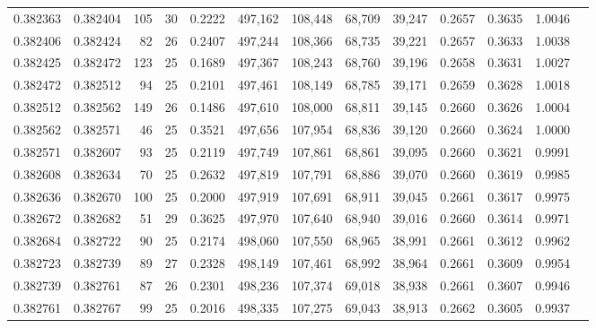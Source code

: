 \begin{tabular}{rrrrrrrrrrrrr}
0.382363 & 0.382404 &   105 &  30 &                                     0.2222 & 497,162 & 108,448 &  68,709 &  39,247 & 0.2657 & 0.3635 & 1.0046 \\
0.382406 & 0.382424 &    82 &  26 &                                     0.2407 & 497,244 & 108,366 &  68,735 &  39,221 & 0.2657 & 0.3633 & 1.0038 \\
0.382425 & 0.382472 &   123 &  25 &                                     0.1689 & 497,367 & 108,243 &  68,760 &  39,196 & 0.2658 & 0.3631 & 1.0027 \\
0.382472 & 0.382512 &    94 &  25 &                                     0.2101 & 497,461 & 108,149 &  68,785 &  39,171 & 0.2659 & 0.3628 & 1.0018 \\
0.382512 & 0.382562 &   149 &  26 &                                     0.1486 & 497,610 & 108,000 &  68,811 &  39,145 & 0.2660 & 0.3626 & 1.0004 \\
0.382562 & 0.382571 &    46 &  25 &                                     0.3521 & 497,656 & 107,954 &  68,836 &  39,120 & 0.2660 & 0.3624 & 1.0000 \\
0.382571 & 0.382607 &    93 &  25 &                                     0.2119 & 497,749 & 107,861 &  68,861 &  39,095 & 0.2660 & 0.3621 & 0.9991 \\
0.382608 & 0.382634 &    70 &  25 &                                     0.2632 & 497,819 & 107,791 &  68,886 &  39,070 & 0.2660 & 0.3619 & 0.9985 \\
0.382636 & 0.382670 &   100 &  25 &                                     0.2000 & 497,919 & 107,691 &  68,911 &  39,045 & 0.2661 & 0.3617 & 0.9975 \\
0.382672 & 0.382682 &    51 &  29 &                                     0.3625 & 497,970 & 107,640 &  68,940 &  39,016 & 0.2660 & 0.3614 & 0.9971 \\
0.382684 & 0.382722 &    90 &  25 &                                     0.2174 & 498,060 & 107,550 &  68,965 &  38,991 & 0.2661 & 0.3612 & 0.9962 \\
0.382723 & 0.382739 &    89 &  27 &                                     0.2328 & 498,149 & 107,461 &  68,992 &  38,964 & 0.2661 & 0.3609 & 0.9954 \\
0.382739 & 0.382761 &    87 &  26 &                                     0.2301 & 498,236 & 107,374 &  69,018 &  38,938 & 0.2661 & 0.3607 & 0.9946 \\
0.382761 & 0.382767 &    99 &  25 &                                     0.2016 & 498,335 & 107,275 &  69,043 &  38,913 & 0.2662 & 0.3605 & 0.9937 \\

\end{tabular}
